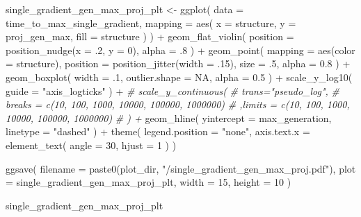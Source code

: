\documentclass[
]{book}
\newenvironment{Shaded}{\begin{snugshade}}{\end{snugshade}}
\newcommand{\AttributeTok}[1]{\textcolor[rgb]{0.77,0.63,0.00}{#1}}
\newcommand{\CommentTok}[1]{\textcolor[rgb]{0.56,0.35,0.01}{\textit{#1}}}
\newcommand{\ConstantTok}[1]{\textcolor[rgb]{0.00,0.00,0.00}{#1}}
\newcommand{\DecValTok}[1]{\textcolor[rgb]{0.00,0.00,0.81}{#1}}
\newcommand{\FloatTok}[1]{\textcolor[rgb]{0.00,0.00,0.81}{#1}}
\newcommand{\FunctionTok}[1]{\textcolor[rgb]{0.00,0.00,0.00}{#1}}
\newcommand{\NormalTok}[1]{#1}
\newcommand{\OtherTok}[1]{\textcolor[rgb]{0.56,0.35,0.01}{#1}}
\newcommand{\SpecialCharTok}[1]{\textcolor[rgb]{0.00,0.00,0.00}{#1}}
\newcommand{\StringTok}[1]{\textcolor[rgb]{0.31,0.60,0.02}{#1}}
\begin{document}
\begin{Shaded}
\begin{Highlighting}[]
\NormalTok{single\_gradient\_gen\_max\_proj\_plt }\OtherTok{\textless{}{-}} \FunctionTok{ggplot}\NormalTok{(}
    \AttributeTok{data =}\NormalTok{ time\_to\_max\_single\_gradient,}
    \AttributeTok{mapping =} \FunctionTok{aes}\NormalTok{(}
      \AttributeTok{x =}\NormalTok{ structure,}
      \AttributeTok{y =}\NormalTok{ proj\_gen\_max,}
      \AttributeTok{fill =}\NormalTok{ structure}
\NormalTok{    )}
\NormalTok{  ) }\SpecialCharTok{+}
  \FunctionTok{geom\_flat\_violin}\NormalTok{(}
    \AttributeTok{position =} \FunctionTok{position\_nudge}\NormalTok{(}\AttributeTok{x =}\NormalTok{ .}\DecValTok{2}\NormalTok{, }\AttributeTok{y =} \DecValTok{0}\NormalTok{),}
    \AttributeTok{alpha =}\NormalTok{ .}\DecValTok{8}
\NormalTok{  ) }\SpecialCharTok{+}
  \FunctionTok{geom\_point}\NormalTok{(}
    \AttributeTok{mapping =} \FunctionTok{aes}\NormalTok{(}\AttributeTok{color =}\NormalTok{ structure),}
    \AttributeTok{position =} \FunctionTok{position\_jitter}\NormalTok{(}\AttributeTok{width =}\NormalTok{ .}\DecValTok{15}\NormalTok{),}
    \AttributeTok{size =}\NormalTok{ .}\DecValTok{5}\NormalTok{,}
    \AttributeTok{alpha =} \FloatTok{0.8}
\NormalTok{  ) }\SpecialCharTok{+}
  \FunctionTok{geom\_boxplot}\NormalTok{(}
    \AttributeTok{width =}\NormalTok{ .}\DecValTok{1}\NormalTok{,}
    \AttributeTok{outlier.shape =} \ConstantTok{NA}\NormalTok{,}
    \AttributeTok{alpha =} \FloatTok{0.5}
\NormalTok{  ) }\SpecialCharTok{+}
  \FunctionTok{scale\_y\_log10}\NormalTok{(}
    \AttributeTok{guide =} \StringTok{"axis\_logticks"}
\NormalTok{  ) }\SpecialCharTok{+}
  \CommentTok{\# scale\_y\_continuous(}
  \CommentTok{\#   trans="pseudo\_log",}
  \CommentTok{\#   breaks = c(10, 100, 1000, 10000, 100000, 1000000)}
  \CommentTok{\#   ,limits = c(10, 100, 1000, 10000, 100000, 1000000)}
  \CommentTok{\# ) +}
  \FunctionTok{geom\_hline}\NormalTok{(}
    \AttributeTok{yintercept =}\NormalTok{ max\_generation,}
    \AttributeTok{linetype =} \StringTok{"dashed"}
\NormalTok{  ) }\SpecialCharTok{+}
  \FunctionTok{theme}\NormalTok{(}
    \AttributeTok{legend.position =} \StringTok{"none"}\NormalTok{,}
    \AttributeTok{axis.text.x =} \FunctionTok{element\_text}\NormalTok{(}
      \AttributeTok{angle =} \DecValTok{30}\NormalTok{,}
      \AttributeTok{hjust =} \DecValTok{1}
\NormalTok{    )}
\NormalTok{  )}

\FunctionTok{ggsave}\NormalTok{(}
  \AttributeTok{filename =} \FunctionTok{paste0}\NormalTok{(plot\_dir, }\StringTok{"/single\_gradient\_gen\_max\_proj.pdf"}\NormalTok{),}
  \AttributeTok{plot =}\NormalTok{ single\_gradient\_gen\_max\_proj\_plt,}
  \AttributeTok{width =} \DecValTok{15}\NormalTok{,}
  \AttributeTok{height =} \DecValTok{10}
\NormalTok{)}

\NormalTok{single\_gradient\_gen\_max\_proj\_plt}
\end{Highlighting}
\end{Shaded}
\end{document}
